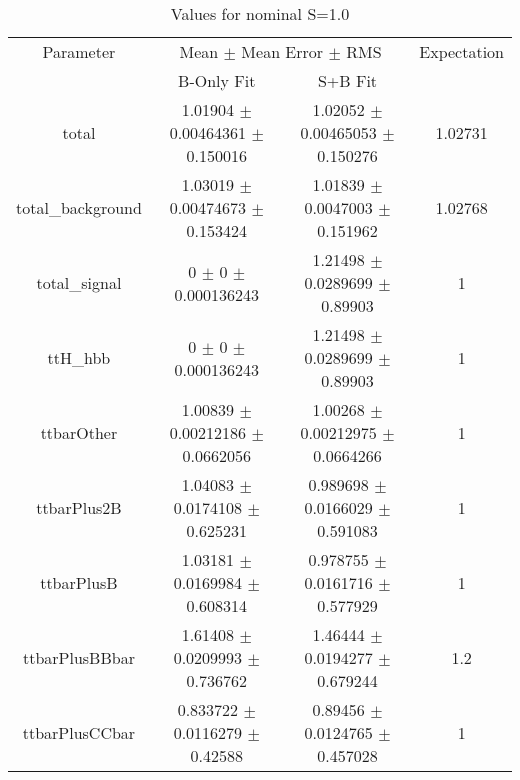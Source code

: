 \begin{table}
\centering
\caption{Values for nominal S=1.0}
\begin{tabular}{cccc}
\toprule
Parameter & \multicolumn{2}{c}{Mean $\pm$ Mean Error $\pm$ RMS} & Expectation\\
 & B-Only Fit & S+B Fit & \\
\midrule
total & \num{1.01904} $\pm$ \num{0.00464361} $\pm$ \num{0.150016} & \num{1.02052} $\pm$ \num{0.00465053} $\pm$ \num{0.150276} & \num{1.02731}\\
total\_background & \num{1.03019} $\pm$ \num{0.00474673} $\pm$ \num{0.153424} & \num{1.01839} $\pm$ \num{0.0047003} $\pm$ \num{0.151962} & \num{1.02768}\\
total\_signal & \num{0} $\pm$ \num{0} $\pm$ \num{0.000136243} & \num{1.21498} $\pm$ \num{0.0289699} $\pm$ \num{0.89903} & \num{1}\\
ttH\_hbb & \num{0} $\pm$ \num{0} $\pm$ \num{0.000136243} & \num{1.21498} $\pm$ \num{0.0289699} $\pm$ \num{0.89903} & \num{1}\\
ttbarOther & \num{1.00839} $\pm$ \num{0.00212186} $\pm$ \num{0.0662056} & \num{1.00268} $\pm$ \num{0.00212975} $\pm$ \num{0.0664266} & \num{1}\\
ttbarPlus2B & \num{1.04083} $\pm$ \num{0.0174108} $\pm$ \num{0.625231} & \num{0.989698} $\pm$ \num{0.0166029} $\pm$ \num{0.591083} & \num{1}\\
ttbarPlusB & \num{1.03181} $\pm$ \num{0.0169984} $\pm$ \num{0.608314} & \num{0.978755} $\pm$ \num{0.0161716} $\pm$ \num{0.577929} & \num{1}\\
ttbarPlusBBbar & \num{1.61408} $\pm$ \num{0.0209993} $\pm$ \num{0.736762} & \num{1.46444} $\pm$ \num{0.0194277} $\pm$ \num{0.679244} & \num{1.2}\\
ttbarPlusCCbar & \num{0.833722} $\pm$ \num{0.0116279} $\pm$ \num{0.42588} & \num{0.89456} $\pm$ \num{0.0124765} $\pm$ \num{0.457028} & \num{1}\\
\bottomrule
\end{tabular}
\end{table}